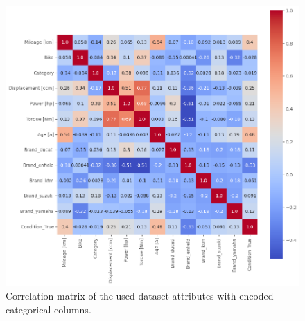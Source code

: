 \begin{figure}[!]
    \centering
        \includegraphics[width=1\textwidth]{"content/pics/correlation_matrix.png"}
        \caption{Correlation matrix of the used dataset attributes with encoded categorical columns.}
        \label{fig:}
\end{figure}